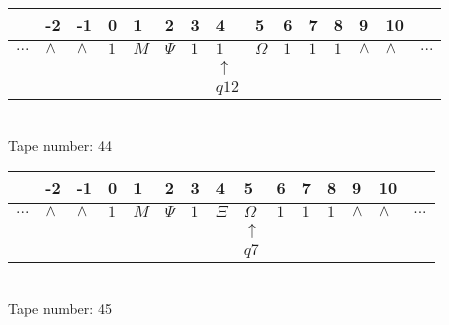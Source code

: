 \documentclass{article}
\begin{document}
\begin{table}[H]
\centering
\begin{tabular}{lllllllllllllll}
 & -2 & -1 & 0 & 1 & 2 & 3 & 4 & 5 & 6 & 7 & 8 & 9 & 10 & \\
\hline
$...$ & \multicolumn{1}{|l|}{$\wedge$} & \multicolumn{1}{|l|}{$\wedge$} & \multicolumn{1}{|l|}{$1$} & \multicolumn{1}{|l|}{$M$} & \multicolumn{1}{|l|}{$\Psi$} & \multicolumn{1}{|l|}{$1$} & \multicolumn{1}{|l|}{$1$} & \multicolumn{1}{|l|}{$\Omega$} & \multicolumn{1}{|l|}{$1$} & \multicolumn{1}{|l|}{$1$} & \multicolumn{1}{|l|}{$1$} & \multicolumn{1}{|l|}{$\wedge$} & \multicolumn{1}{|l|}{$\wedge$} & $...$\\
\hline
&  &  &  &  &  &  & $\uparrow$ &  &  &  &  &  &  &  \\
&  &  &  &  &  &  & $ q12 $ &  &  &  &  &  &  &  \\
\end{tabular}
\\
Tape number: 44
\noindent\makebox[\linewidth]{\hdashrule{\textwidth}{1pt}{1pt}}\end{table}

\begin{table}[H]
\centering
\begin{tabular}{lllllllllllllll}
 & -2 & -1 & 0 & 1 & 2 & 3 & 4 & 5 & 6 & 7 & 8 & 9 & 10 & \\
\hline
$...$ & \multicolumn{1}{|l|}{$\wedge$} & \multicolumn{1}{|l|}{$\wedge$} & \multicolumn{1}{|l|}{$1$} & \multicolumn{1}{|l|}{$M$} & \multicolumn{1}{|l|}{$\Psi$} & \multicolumn{1}{|l|}{$1$} & \multicolumn{1}{|l|}{$\Xi$} & \multicolumn{1}{|l|}{$\Omega$} & \multicolumn{1}{|l|}{$1$} & \multicolumn{1}{|l|}{$1$} & \multicolumn{1}{|l|}{$1$} & \multicolumn{1}{|l|}{$\wedge$} & \multicolumn{1}{|l|}{$\wedge$} & $...$\\
\hline
&  &  &  &  &  &  &  & $\uparrow$ &  &  &  &  &  &  \\
&  &  &  &  &  &  &  & $ q7 $ &  &  &  &  &  &  \\
\end{tabular}
\\
Tape number: 45
\noindent\makebox[\linewidth]{\hdashrule{\textwidth}{1pt}{1pt}}\end{table}
\end{document}
